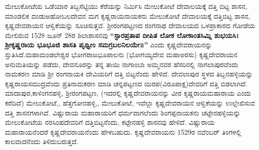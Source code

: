 ಮೇಲುಕೋಟೆಯ ಒಡೆಯಾರ ತಿಬ್ಬಸೆಟ್ಟಿಯು ಕೆರೆಯನ್ನು ನಿರ್ಮಿಸಿ ಮೇಲುಕೋಟೆ ದೇವಾಲಯಕ್ಕೆ ದತ್ತಿ ಬಿಟ್ಟ ಶಾಸನ, ಮಾಂಡಲಿಕ ದಂಡುಅಹೋಬಲದೇವನ ಮಗ ಕೃಷ್ಣರಾಯನಾಯಕನು ಮೇಲುಕೋಟೆ ದೇವಾಲಯಕ್ಕೆ ದತ್ತಿಬಿಟ್ಟ ಶಾಸನ, ಕೃಷ್ಣದೇವರಾಯನ ಆಳ್ವಿಕೆಯನ್ನು ಸೂಚಿಸುತ್ತವೆ. ಶ‍್ರೀರಂಗಪಟ್ಟಣದ ರಂಗನಾಥ ದೇವಾಲಯದ ಒಳಪ್ರಾಕಾರದ ಗೋಡೆಯ ಮೇಲಿರುವ 1528 ಜೂನ್​ 28ರ ಶಿಲಾಶಾಸನವು \textbf{“ಸ್ಫಾರಪ್ರತಾಪ ದೀಪಿತ ಲೋಕ ಲೋಕಾಂತಸಿಮ್ನಿ ಶುಭಯಸಿ। ಶ‍್ರೀಕೃಷ್ಣರಾಯ ಭೂಭೂಜಿ ಶಾಸತಿ ಪೃಥ್ವೀಂ ಸಮಗ್ರಬಲನಿಲಯೇ॥”} ಎಂದು ಕೃಷ್ಣದೇವರಾಯನನ್ನು ಸ್ತುತಿಸಿದೆ.\break ಮಹಾಮಂಡಲೇಶ್ವರ ಭೋಗರಾಜಭೂಪಾಲನು (ಭೋಗಯ್ಯದೇವ ಮಹಾಅರಸು) ಕೃಷ್ಣದೇವರಾಯನ ಅನುಮತಿಯನ್ನು ಪಡೆದು, ದೇವನೂರನ್ನು ತನ್ನ ತಾಯಿ ನಾಗಾಂಬಾ ಅಮ್ಮನವರ ಹೆಸರಿನಲ್ಲಿ ನಾಗಲಾಪುರವೆಂದು ನಾಮಕರಣ ಮಾಡಿ ಶ‍್ರೀ ರಂಗನಾಯಕಿ ದೇವಿಯರಿಗೆ ದತ್ತಿ ಬಿಟ್ಟನೆಂದು ಹೇಳಿದೆ. ದೇವಲಾಪುರ ಸ್ಥಳದ ತಿಬ್ಬನಹಳ್ಳಿಯನ್ನು ಕೃಷ್ಣರಾಯಸಮುದ್ರವೆಂದು ಪ್ರತಿನಾಮಕರಣ ಮಾಡಿ ಚನ್ನಪಟ್ಟಣದ ಯಿರಪ(ವಿರೂಪಾಕ್ಷ)ದೇವರಿಗೆ ದತ್ತಿ ಬಿಡಲಾಗಿದೆ. ಮಾದಾಪುರ,\break ಕಾಳಿಂಗನಹಳ್ಳಿ, ಶ‍್ರೀರಂಗಪಟ್ಟಣ, (ಇದರಲ್ಲಿ ಕೃಷ್ಣದೇವರಾಯನನ್ನು ವೀರ ಕೃಷ್ಣರಾಯಮಹಾರಾಯ ಎಂದು ಕರೆದಿದೆ) ಮೇಲುಕೋಟೆ,, ಹೆತ್ತಗೋನಹಳ್ಳಿ,, ಮೇಲುಕೋಟೆ, ಇವೆಲ್ಲಾ ಕೃಷ್ಣದೇವರಾಯನ ಆಳ್ವಿಕೆಯನ್ನು ಉಲ್ಲೇಖಿಸುವ ದತ್ತಿ ಶಾಸನಗಳಾಗಿವೆ. ವಿಷ್ಣುರಾಯ ಮಹಾರಾಯರಿಗೆ ಧರ್ಮವಾಗಲೆಂದು ಶಿಂಗಪ್ಪನಾಯಕನು ಚಟ್ಟೇನಹಳ್ಳಿಯನ್ನು ಮೇಲುಕೋಟೆಯ ನರಸಿಂಹದೇವರಿಗೆ ದತ್ತಿಬಿಟ್ಟ\-ನೆಂದು, ಕಟ್ಟೇನಹಳ್ಳಿ ಶಾಸನವು ಹೇಳಿದೆ. ವಿಷ್ಣುರಾಯ ಮಹಾರಾಯನೆಂದರೆ ಕೃಷ್ಣದೇವರಾಯನೆಂದು ಹೇಳಬಹುದು. ಕೃಷ್ಣದೇವರಾಯನು 1529ರ ನವೆಂಬರ್​ ತಿಂಗಳಲ್ಲಿ ಕಾಲವಾದನೆಂದು ತಿಳಿದುಬರುತ್ತದೆ.

